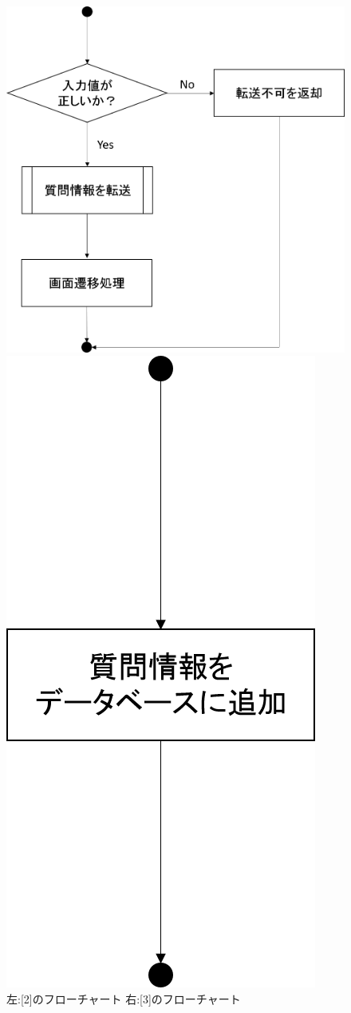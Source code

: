\begin{figure}[htbp]
 \begin{minipage}{0.5\hsize}
  \begin{center}
   \includegraphics[width=1.2\linewidth,clip]{./img/q_send/sub2.png}
  \end{center}
 \end{minipage}
 \begin{minipage}{0.5\hsize}
  \begin{center}
   \includegraphics[width=0.45\linewidth,clip]{./img/q_send/sub3.png}
  \end{center}
 \end{minipage}
 \caption{左:[2]のフローチャート 右:[3]のフローチャート}\label{fig:qsendflow0}
\end{figure}


